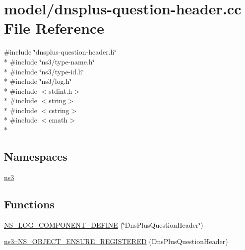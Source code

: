 \hypertarget{dnsplus-question-header_8cc}{\section{model/dnsplus-\/question-\/header.cc File Reference}
\label{dnsplus-question-header_8cc}
}
{\ttfamily \#include \char`\"{}dnsplus-\/question-\/header.\-h\char`\"{}}\\*
{\ttfamily \#include \char`\"{}ns3/type-\/name.\-h\char`\"{}}\\*
{\ttfamily \#include \char`\"{}ns3/type-\/id.\-h\char`\"{}}\\*
{\ttfamily \#include \char`\"{}ns3/log.\-h\char`\"{}}\\*
{\ttfamily \#include $<$stdint.\-h$>$}\\*
{\ttfamily \#include $<$string$>$}\\*
{\ttfamily \#include $<$cstring$>$}\\*
{\ttfamily \#include $<$cmath$>$}\\*
\subsection*{Namespaces}
\begin{DoxyCompactItemize}
\item 
\hyperlink{namespacens3}{ns3}
\end{DoxyCompactItemize}
\subsection*{Functions}
\begin{DoxyCompactItemize}
\item 
\hyperlink{dnsplus-question-header_8cc_a207cd71e360cd199cf3c0c6d1eba5b64}{N\-S\-\_\-\-L\-O\-G\-\_\-\-C\-O\-M\-P\-O\-N\-E\-N\-T\-\_\-\-D\-E\-F\-I\-N\-E} (\char`\"{}Dns\-Plus\-Question\-Header\char`\"{})
\item 
\hyperlink{namespacens3_a80d7142232aff7f2dc93bc1712e44175}{ns3\-::\-N\-S\-\_\-\-O\-B\-J\-E\-C\-T\-\_\-\-E\-N\-S\-U\-R\-E\-\_\-\-R\-E\-G\-I\-S\-T\-E\-R\-E\-D} (Dns\-Plus\-Question\-Header)
\end{DoxyCompactItemize}


